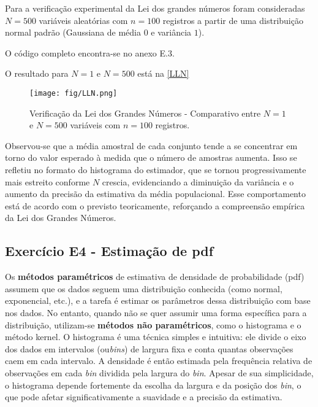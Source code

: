 \documentclass{article}
\begin{document}
  Para a verificação experimental da Lei dos grandes números foram consideradas $N=500$ variáveis aleatórias com $n=100$ registros a partir de uma distribuição normal padrão (Gaussiana de média $0$ e variância $1$).
  
  O código completo encontra-se no anexo E.3. 
  
  O resultado para $N=1$ e $N=500$  está na \autoref{LLN} 
   
    \begin{figure}[ht]
   	\centering %
   	\texttt{[image: fig/LLN.png]} %
   	\caption{Verificação da Lei dos Grandes Números - Comparativo entre $N=1$ e $N=500$ variáveis com $n=100$ registros.} %
   	\label{LLN} %
   \end{figure} 
  
  
  Observou-se que a média amostral de cada conjunto tende a se concentrar em torno do valor esperado à medida que o número de amostras aumenta. Isso se refletiu no formato do histograma do estimador, que se tornou progressivamente mais estreito conforme $N$ crescia, evidenciando a diminuição da variância e o aumento da precisão da estimativa da média populacional. Esse comportamento está de acordo com o previsto teoricamente, reforçando a compreensão empírica da Lei dos Grandes Números.
 
 \subsection{ Exerc\'icio E4 - Estimação de pdf}
 
 Os \textbf{métodos paramétricos} de estimativa de densidade de probabilidade (pdf) assumem que os dados seguem uma distribuição conhecida (como normal, exponencial, etc.), e a tarefa é estimar os parâmetros dessa distribuição com base nos dados. No entanto, quando não se quer assumir uma forma específica para a distribuição, utilizam-se \textbf{métodos não paramétricos}, como o histograma e o método kernel. O histograma é uma técnica simples e intuitiva: ele divide o eixo dos dados em intervalos (ou\textit{bins}) de largura fixa e conta quantas observações caem em cada intervalo. A densidade é então estimada pela frequência relativa de observações em cada \textit{bin} dividida pela largura do \textit{bin}. Apesar de sua simplicidade, o histograma depende fortemente da escolha da largura e da posição dos \textit{bin}, o que pode afetar significativamente a suavidade e a precisão da estimativa.
 
\end{document}
